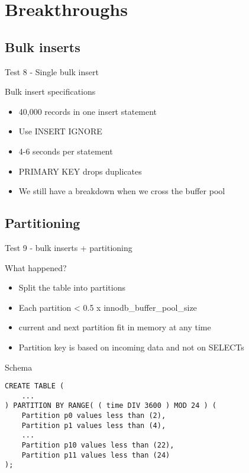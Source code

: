 \documentclass{beamer}
\begin{document}
\section{Breakthroughs}
\subsection{Bulk inserts}
\begin{frame}{Test 8 - Single bulk insert}
\end{frame}

\begin{frame}{Bulk insert specifications}
  \begin{itemize}
  \item 40,000 records in one insert statement
  \item Use INSERT IGNORE
  \item 4-6 seconds per statement
  \item PRIMARY KEY drops duplicates
  \item We still have a breakdown when we cross the buffer pool
  \end{itemize}
\end{frame}

\subsection{Partitioning}
\begin{frame}{Test 9 - bulk inserts + partitioning}
\end{frame}

\begin{frame}{What happened?}
  \begin{itemize}
  \item Split the table into partitions
  \item Each partition < 0.5 x innodb\_buffer\_pool\_size
  \item current and next partition fit in memory at any time
  \item Partition key is based on incoming data and not on SELECTs
  \end{itemize}
\end{frame}

\begin{frame}[fragile]{Schema}
\begin{verbatim}
CREATE TABLE (
    ...
) PARTITION BY RANGE( ( time DIV 3600 ) MOD 24 ) (
    Partition p0 values less than (2),
    Partition p1 values less than (4),
    ...
    Partition p10 values less than (22),
    Partition p11 values less than (24)
); 
\end{verbatim}
\end{frame}
\end{document}
